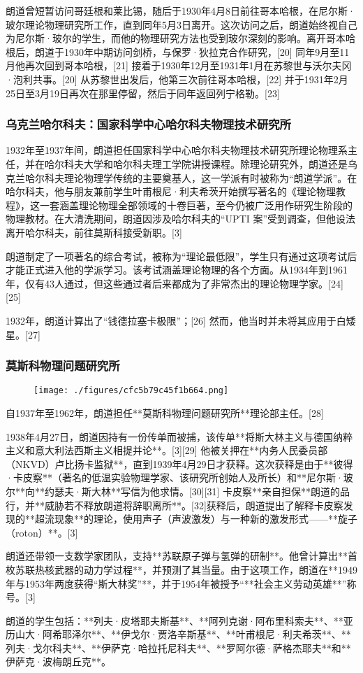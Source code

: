 朗道曾短暂访问哥廷根和莱比锡，随后于1930年4月8日前往哥本哈根，在尼尔斯·玻尔理论物理研究所工作，直到同年5月3日离开。这次访问之后，朗道始终视自己为尼尔斯·玻尔的学生，而他的物理研究方法也受到玻尔深刻的影响。离开哥本哈根后，朗道于1930年中期访问剑桥，与保罗·狄拉克合作研究，[20] 同年9月至11月他再次回到哥本哈根，[21] 接着于1930年12月至1931年1月在苏黎世与沃尔夫冈·泡利共事。[20] 从苏黎世出发后，他第三次前往哥本哈根，[22] 并于1931年2月25日至3月19日再次在那里停留，然后于同年返回列宁格勒。[23]
\subsubsection{乌克兰哈尔科夫：国家科学中心哈尔科夫物理技术研究所}
1932年至1937年间，朗道担任国家科学中心哈尔科夫物理技术研究所理论物理系主任，并在哈尔科夫大学和哈尔科夫理工学院讲授课程。除理论研究外，朗道还是乌克兰哈尔科夫理论物理学传统的主要奠基人，这一学派有时被称为“朗道学派”。在哈尔科夫，他与朋友兼前学生叶甫根尼·利夫希茨开始撰写著名的《理论物理教程》，这一套涵盖理论物理全部领域的十卷巨著，至今仍被广泛用作研究生阶段的物理教材。在大清洗期间，朗道因涉及哈尔科夫的“UPTI 案”受到调查，但他设法离开哈尔科夫，前往莫斯科接受新职。[3]

朗道制定了一项著名的综合考试，被称为“理论最低限”，学生只有通过这项考试后才能正式进入他的学派学习。该考试涵盖理论物理的各个方面。从1934年到1961年，仅有43人通过，但这些通过者后来都成为了非常杰出的理论物理学家。[24][25]

1932年，朗道计算出了“钱德拉塞卡极限”；[26] 然而，他当时并未将其应用于白矮星。[27]
\subsubsection{莫斯科物理问题研究所}
\begin{figure}[ht]
\centering
\texttt{[image: ./figures/cfc5b79c45f1b664.png]}
\caption{} \label{fig_LFLD_3}
\end{figure}
自1937年至1962年，朗道担任**莫斯科物理问题研究所**理论部主任。[28]

1938年4月27日，朗道因持有一份传单而被捕，该传单**将斯大林主义与德国纳粹主义和意大利法西斯主义相提并论**。[3][29] 他被关押在**内务人民委员部（NKVD）卢比扬卡监狱**，直到1939年4月29日才获释。这次获释是由于**彼得·卡皮察**（著名的低温实验物理学家、该研究所创始人及所长）和**尼尔斯·玻尔**向**约瑟夫·斯大林**写信为他求情。[30][31] 卡皮察**亲自担保**朗道的品行，并**威胁若不释放朗道将辞职离所**。[32]获释后，朗道提出了解释卡皮察发现的**超流现象**的理论，使用\*\*声子（声波激发）\*\*与一种新的激发形式——**旋子（roton）**。[3]

朗道还带领一支数学家团队，支持**苏联原子弹与氢弹的研制**。他曾计算出**首枚苏联热核武器的动力学过程**，并预测了其当量。由于这项工作，朗道在**1949年与1953年两度获得“斯大林奖”**，并于1954年被授予“**社会主义劳动英雄**”称号。[3]

朗道的学生包括：**列夫·皮塔耶夫斯基**、**阿列克谢·阿布里科索夫**、**亚历山大·阿希耶泽尔**、**伊戈尔·贾洛辛斯基**、**叶甫根尼·利夫希茨**、**列夫·戈尔科夫**、**伊萨克·哈拉托尼科夫**、**罗阿尔德·萨格杰耶夫**和**伊萨克·波梅朗丘克**。
